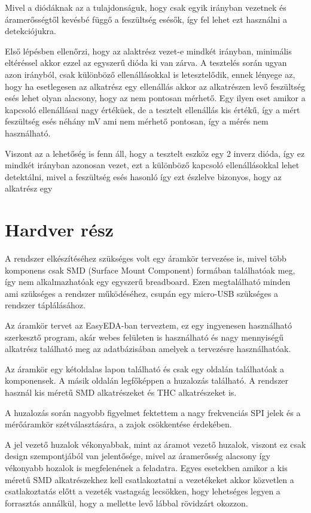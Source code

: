 Mivel a diódáknak az a tulajdonságuk, hogy csak egyik irányban vezetnek
és áramerősségtől kevésbé függő a feszültség esésők, így fel lehet ezt
használni a detekciójukra.

Első lépésben ellenőrzi, hogy az alaktrész vezet-e mindkét irányban, 
minimális eltéréssel akkor ezzel az egyszerű dióda ki van zárva.
A tesztelés során ugyan azon irányból, csak különböző ellenállásokkal
is letesztelődik, ennek lényege az, hogy ha esetlegesen az alkatrész
egy ellenállás akkor az alkatrészen levő feszültség esés lehet olyan alacsony,
hogy az nem pontosan mérhető. 
Egy ilyen eset amikor a kapcsoló ellenállásai nagy értéküek, de a tesztelt 
ellenállás kis értékű, így
a mért feszültség esés néhány mV ami nem mérhető pontosan, így a 
mérés nem használható. 

Viszont az a lehetőség is fenn áll, hogy a tesztelt eszköz egy 2 
inverz dióda, így ez mindkét irányban azonosan vezet, ezt a különböző
kapcsoló ellenállásokkal lehet detektálni, mivel a feszültség esés hasonló
így ezt észlelve bizonyos, hogy az alkatrész egy 



\section{Hardver rész}

A rendszer elkészítéséhez szükséges volt egy áramkör tervezése is, mivel több komponens
csak SMD (Surface Mount Component) formában találhatóak meg, így nem alkalmazhatóak egy
egyszerű breadboard. Ezen megtalálható minden ami szükséges a rendszer működéséhez, 
csupán egy micro-USB szükséges a rendszer táplálásához.

Az áramkör tervet az EasyEDA-ban terveztem, ez egy ingyenesen használható szerkesztő
program, akár webes felületen is használható és nagy mennyiségű alkatrész található
meg az adatbázisában amelyek a tervezésre használhatóak.

Az áramkör egy kétoldalas lapon található és csak egy oldalán találhatóak a komponensek.
A másik oldalán legfőképpen a huzalozás található. A rendszer használ kis méretű
SMD alkatrészeket és THC alkatrészeket is. 

A huzalozás során nagyobb figyelmet fektettem a nagy frekvenciás SPI jelek
és a mérőáramkör szétválasztására, a zajok csökkentése érdekében.

A jel vezető huzalok vékonyabbak, mint az áramot vezető huzalok, viszont ez csak
design szempontjából van jelentősége, mivel az áramerősség alacsony így vékonyabb
hozalok is megfelenének a feladatra. Egyes esetekben amikor a kis méretű SMD 
alkatrészekhez kell csatlakoztatni a vezetékeket akkor közvetlen a csatlakoztatás
előtt a vezeték vastagság lecsökken, hogy lehetséges legyen a forrasztás annálkül,
hogy a mellette levő lábbal rövidzárt okozzon.

